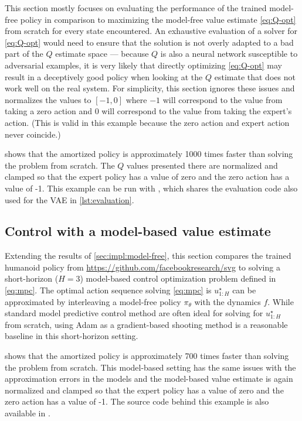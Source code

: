 This section mostly focuses on evaluating the performance
of the trained model-free policy in comparison
to maximizing the model-free value estimate
\cref{eq:Q-opt} from scratch for every state encountered.
An exhaustive evaluation of a solver for \cref{eq:Q-opt}
would need to ensure that the solution is not overly
adapted to a bad part of the $Q$ estimate space ---
because $Q$ is also a neural network susceptible to
adversarial examples, it is very likely that directly
optimizing \cref{eq:Q-opt} may result in a deceptively
good policy when looking at the $Q$ estimate that does not
work well on the real system.
For simplicity, this section ignores these
issues and normalizes the values to $[-1,0]$ where
$-1$ will correspond to the value from taking a zero
action and $0$ will correspond to the value
from taking the expert's action.
(This is valid in this example because the zero
action and expert action never coincide.)

 shows that the
amortized policy is approximately 1000 times faster
than solving the problem from scratch.
The $Q$ values presented there are normalized and clamped
so that the expert policy has a value of zero and
the zero action has a value of -1.
This example can be run with
,
which shares the evaluation code also used for the VAE
in \cref{lst:evaluation}.

\subsection{Control with a model-based value estimate}
\label{sec:impl:model-based}

Extending the results of \cref{sec:impl:model-free},
this section compares the trained humanoid policy
from \url{https://github.com/facebookresearch/svg}
to solving a short-horizon ($H=3$) model-based control
optimization problem defined in \cref{eq:mpc}.
The optimal action sequence solving \cref{eq:mpc}
is $u^\star_{1:H}$ can be approximated by interleaving
a model-free policy $\pi_\theta$ with the dynamics $f$.
While standard model predictive control method are
often ideal for solving for $u^\star_{1:H}$ from scratch,
using Adam as a gradient-based shooting method is
a reasonable baseline in this short-horizon setting.

 shows that the
amortized policy is approximately 700 times faster
than solving the problem from scratch.
This model-based setting has the same issues with
the approximation errors in the models and the
model-based value estimate is again
normalized and clamped so that the expert
policy has a value of zero and the zero action has a value of -1.
The source code behind this example is also available in
.

